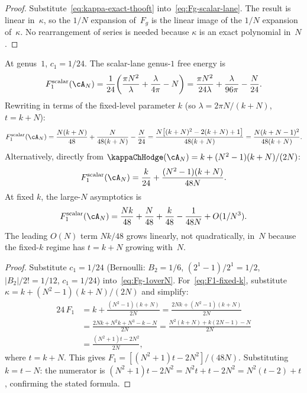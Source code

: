 \begin{proof}
Substitute~\eqref{eq:kappa-exact-thooft}
into~\eqref{eq:Fg-scalar-lane}. The result is linear in~$\kappa$,
so the $1/N$ expansion of~$F_g$ is the linear image of the $1/N$
expansion of~$\kappa$. No rearrangement of series is needed because
$\kappa$ is an exact polynomial in~$N$.
\end{proof}

\begin{computation}
\label{comp:genus1-1overN}
At genus~$1$, $c_1 = 1/24$. The scalar-lane genus-$1$ free energy is
\begin{equation}\label{eq:F1-1overN}
F_1^{\mathrm{scalar}}(\cA_N)
= \frac{1}{24}\!\left(
\frac{\pi N^2}{\lambda}
+ \frac{\lambda}{4\pi}
- N
\right)
= \frac{\pi N^2}{24\lambda}
+ \frac{\lambda}{96\pi}
- \frac{N}{24}.
\end{equation}
Rewriting in terms of the fixed-level parameter $k$
(so $\lambda = 2\pi N/(k+N)$, $t = k+N$):
\begin{equation}\label{eq:F1-fixed-k}
F_1^{\mathrm{scalar}}(\cA_N)
= \frac{N(k+N)}{48}
+ \frac{N}{48(k+N)}
- \frac{N}{24}
= \frac{N\!\left[(k+N)^2 - 2(k+N) + 1\right]}{48(k+N)}
= \frac{N(k+N-1)^2}{48(k+N)}.
\end{equation}
Alternatively, directly from $\kappaChHodge(\cA_N) = k + (N^2-1)(k+N)/(2N)$:
\begin{equation}\label{eq:F1-direct}
F_1^{\mathrm{scalar}}(\cA_N) =
\frac{k}{24} + \frac{(N^2-1)(k+N)}{48N}.
\end{equation}
At fixed $k$, the large-$N$ asymptotics is
\[
F_1^{\mathrm{scalar}}(\cA_N)
= \frac{Nk}{48} + \frac{N}{48} + \frac{k}{48} - \frac{1}{48N}
+ O(1/N^3).
\]
The leading $O(N)$ term $Nk/48$ grows linearly, not quadratically, in~$N$
because the fixed-$k$ regime has $t = k + N$ growing with~$N$.
\end{computation}

\begin{proof}
Substitute $c_1 = 1/24$ (Bernoulli: $B_2 = 1/6$,
$(2^1-1)/2^1 = 1/2$, $|B_2|/2! = 1/12$, $c_1 = 1/24$)
into~\eqref{eq:Fg-1overN}.
For~\eqref{eq:F1-fixed-k}, substitute
$\kappa = k + (N^2-1)(k+N)/(2N)$ and simplify:
\begin{align*}
24\,F_1 &= k + \frac{(N^2-1)(k+N)}{2N}
= \frac{2Nk + (N^2-1)(k+N)}{2N} \\
&= \frac{2Nk + N^2 k + N^3 - k - N}{2N}
= \frac{N^2(k+N) + k(2N-1) - N}{2N} \\
&= \frac{(N^2+1)t - 2N^2}{2N},
\end{align*}
where $t = k + N$. This gives
$F_1 = [(N^2+1)t - 2N^2]/(48N)$. Substituting $k = t - N$:
the numerator is $(N^2+1)t - 2N^2 = N^2 t + t - 2N^2
= N^2(t-2) + t$, confirming the stated formula.
\end{proof}


